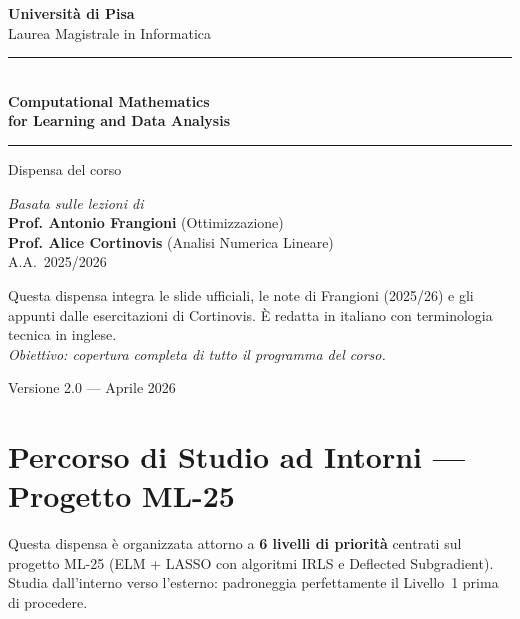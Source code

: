 \documentclass[11pt, a4paper, twoside]{book}
\theoremstyle{definition}
\theoremstyle{plain}
\theoremstyle{remark}
\begin{document}
\begin{titlepage}
\centering
\vspace*{1.5cm}
{\LARGE \textbf{Università di Pisa}\\[0.3em]
\large Laurea Magistrale in Informatica}

\vspace{1cm}
\rule{\textwidth}{1.5pt}\\[0.4em]
{\Huge \textbf{Computational Mathematics}\\[0.4em]
\huge \textbf{for Learning and Data Analysis}}\\[0.2em]
\rule{\textwidth}{1.5pt}

\vspace{0.8cm}
{\Large Dispensa del corso}

\vspace{0.5cm}
{\large
\textit{Basata sulle lezioni di}\\[0.3em]
\textbf{Prof. Antonio Frangioni} (Ottimizzazione)\\
\textbf{Prof. Alice Cortinovis} (Analisi Numerica Lineare)\\[0.5em]
A.A.\ 2025/2026
}

\vfill
\begin{tcolorbox}[colback=NavyBlue!10, colframe=NavyBlue!50, width=0.85\textwidth]
\centering\small
Questa dispensa integra le slide ufficiali, le note di Frangioni (2025/26)
e gli appunti dalle esercitazioni di Cortinovis.
È redatta in italiano con terminologia tecnica in inglese.\\
\textit{Obiettivo: copertura completa di tutto il programma del corso.}
\end{tcolorbox}
\vspace{0.5cm}
{\small Versione 2.0 — Aprile 2026}
\end{titlepage}

\tableofcontents
\clearpage

\chapter*{Percorso di Studio ad Intorni — Progetto ML-25}

Questa dispensa è organizzata attorno a \textbf{6 livelli di priorità} centrati sul progetto ML-25
(ELM + LASSO con algoritmi IRLS e Deflected Subgradient). Studia dall'interno verso
l'esterno: padroneggia perfettamente il Livello~1 prima di procedere.
\end{document}
